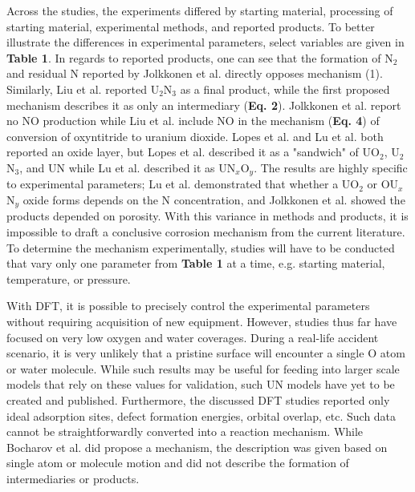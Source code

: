 \documentclass[11pt]{article}
\begin{document}
\begin{multicols}{2}
\par Across the studies, the experiments differed by starting material, processing of starting material, experimental methods, and reported products. To better illustrate the differences in experimental parameters, select variables are given in \textbf{Table 1}. In regards to reported products, one can see that the formation of N$_{2}$ and residual N reported by Jolkkonen et al. \cite{Jolkkonen2017} directly opposes mechanism (1). Similarly, Liu et al. \cite{Liu2013} reported U$_{2}$N$_{3}$ as a final product, while the first proposed mechanism describes it as only an intermediary (\textbf{Eq. 2}). Jolkkonen et al. report no NO production while Liu et al. include NO in the mechanism (\textbf{Eq. 4}) of conversion of oxyntitride to uranium dioxide. Lopes et al. and Lu et al. both reported an oxide layer, but Lopes et al. described it as a "sandwich" of UO$_{2}$, U$_{2}$N$_{3}$, and UN while Lu et al. described it as UN$_{x}$O$_{y}$.
 The results are highly specific to experimental parameters; Lu et al. demonstrated that whether a UO$_{2}$ or  OU$_{x}$N$_{y}$ oxide forms depends on the N concentration, and Jolkkonen et al. showed the products depended on porosity. With this variance in methods and products, it is impossible to draft a conclusive corrosion mechanism from the current literature. To determine the mechanism experimentally, studies will have to be conducted that vary only one parameter from \textbf{Table 1} at a time, e.g. starting material, temperature, or pressure.

\par With DFT, it is possible to precisely control the experimental parameters without requiring acquisition of new equipment. However, studies thus far have focused on very low oxygen and water coverages. During a real-life accident scenario, it is very unlikely that a pristine surface will encounter a single O atom or water molecule. While such results may be useful for feeding into larger scale models that rely on these values for validation, such UN models have yet to be created and published. Furthermore, the discussed DFT studies reported only ideal adsorption sites, defect formation energies, orbital overlap, etc. Such data cannot be straightforwardly converted into a reaction mechanism. While Bocharov et al. \cite{Bocharov2013} did propose a mechanism, the description was given based on single atom or molecule motion and did not describe the formation of intermediaries or products.


\end{multicols}
\end{document}
